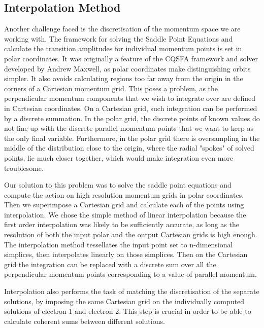 \documentclass[11pt]{article}
\numberwithin{equation}{section}
\begin{document}
\subsection{Interpolation Method}
Another challenge faced is the discretisation of the momentum space we are working with. The framework for solving the Saddle Point Equations and calculate the transition amplitudes for individual momentum points is set in polar coordinates. It was originally a feature of the CQSFA framework and solver developed by Andrew Maxwell, as polar coordinates make distinguishing orbits simpler. It also avoids calculating regions too far away from the origin in the corners of a Cartesian momentum grid. This poses a problem, as the perpendicular momentum components that we wish to integrate over are defined in Cartesian coordinates. On a Cartesian grid, such integration can be performed by a discrete summation. In the polar grid, the discrete points of known values do not line up with the discrete parallel momentum points that we want to keep as the only final variable. Furthermore, in the polar grid there is oversampling in the middle of the distribution close to the origin, where the radial "spokes" of solved points, lie much closer together, which would make integration even more troublesome.
\par
Our solution to this problem was to solve the saddle point equations and compute the action on high resolution momentum grids in polar coordinates. Then we superimpose a Cartesian grid and calculate each of the points using interpolation. We chose the simple method of linear interpolation because the first order interpolation was likely to be sufficiently accurate, as long as the resolution of both the input polar and the output Cartesian grids is high enough. The interpolation method tessellates the input point set to n-dimensional simplices, then interpolates linearly on those simplices. Then on the Cartesian grid the integration can be replaced with a discrete sum over all the perpendicular momentum points corresponding to a value of parallel momentum.
\par
Interpolation also performs the task of matching the discretisation of the separate solutions, by imposing the same Cartesian grid on the individually computed solutions of electron 1 and electron 2. This step is crucial in order to be able to calculate coherent sums between different solutions.
\end{document}
